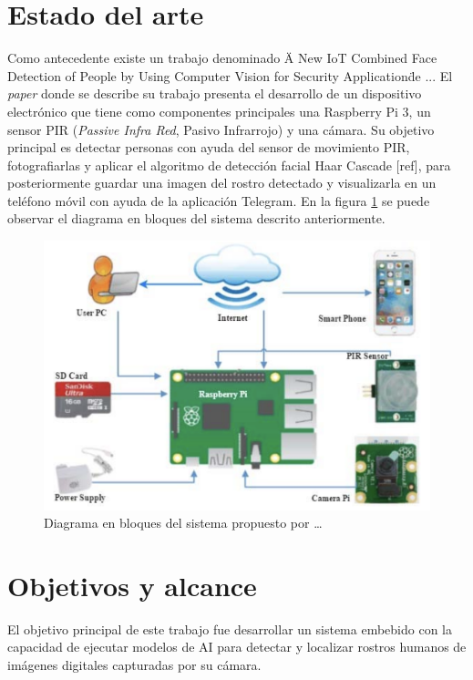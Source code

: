 \section{Estado del arte}
Como antecedente existe un trabajo denominado \"A New IoT Combined Face Detection of People by Using Computer Vision for Security Application\" de ... El \textit{paper} donde se describe su trabajo presenta el desarrollo de un dispositivo electrónico que tiene como componentes principales una Raspberry Pi 3, un sensor PIR (\textit{Passive Infra Red}, Pasivo Infrarrojo) y una cámara. Su objetivo principal es detectar personas con ayuda del sensor de movimiento PIR, fotografiarlas y aplicar el algoritmo de detección facial Haar Cascade [ref], para posteriormente guardar una imagen del rostro detectado y visualizarla en un teléfono móvil con ayuda de la aplicación Telegram. En la figura \ref{fig:soa_arch} se puede observar el diagrama en bloques del sistema descrito anteriormente.

\begin{figure}[h]
	\centering
	\includegraphics[scale=0.3]{./Figures/soa_arch.png}
	\caption{Diagrama en bloques del sistema propuesto por …}
	\label{fig:soa_arch}
\end{figure}

\section{Objetivos y alcance}
El objetivo principal de este trabajo fue desarrollar un sistema embebido con la capacidad de ejecutar modelos de AI para detectar y localizar rostros humanos de imágenes digitales capturadas por su cámara.

